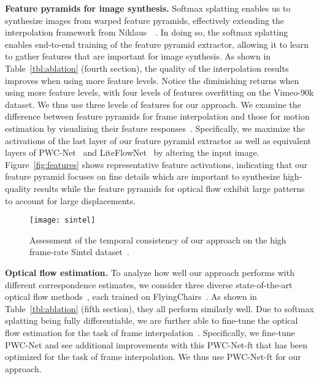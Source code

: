 \documentclass[10pt,twocolumn,letterpaper]{article}
\begin{document}
\vspace{0.05in}
\noindent\textbf{Feature pyramids for image synthesis.} Softmax splatting enables us to synthesize images from warped feature pyramids, effectively extending the interpolation framework from Niklaus~\etal~\cite{Niklaus_CVPR_2018}. In doing so, the softmax splatting enables end-to-end training of the feature pyramid extractor, allowing it to learn to gather features that are important for image synthesis. As shown in Table~\ref{tbl:ablation} (fourth section), the quality of the interpolation results improves when using more feature levels. Notice the diminishing returns when using more feature levels, with four levels of features overfitting on the Vimeo-90k dataset. We thus use three levels of features for our approach. We examine the difference between feature pyramids for frame interpolation and those for motion estimation by visualizing their feature responses~\cite{Erhan_OTHER_2009}. Specifically, we maximize the activations of the last layer of our feature pyramid extractor as well as equivalent layers of PWC-Net~\cite{Sun_CVPR_2018} and LiteFlowNet~\cite{Hui_CVPR_2018} by altering the input image. Figure~\ref{fig:features} shows representative feature activations, indicating that our feature pyramid focuses on fine details which are important to synthesize high-quality results while the feature pyramids for optical flow exhibit large patterns to account for large displacements.

\begin{figure}\centering
    \hspace{-0.1cm}\texttt{[image: sintel]}\vspace{-0.2cm}
	\caption{Assessment of the temporal consistency of our approach on the high frame-rate Sintel dataset~\cite{Janai_CVPR_2017}.}\vspace{-0.3cm}
	\label{fig:sintel}
\end{figure}

\vspace{0.05in}
\noindent\textbf{Optical flow estimation.} To analyze how well our approach performs with different correspondence estimates, we consider three diverse state-of-the-art optical flow methods~\cite{Hui_CVPR_2018, Ilg_CVPR_2017, Sun_CVPR_2018}, each trained on FlyingChairs~\cite{Dosovitskiy_ICCV_2015}. As shown in Table~\ref{tbl:ablation} (fifth section), they all perform similarly well. Due to softmax splatting being fully differentiable, we are further able to fine-tune the optical flow estimation for the task of frame interpolation~\cite{Xue_IJCV_2019}. Specifically, we fine-tune PWC-Net and see additional improvements with this PWC-Net-ft that has been optimized for the task of frame interpolation. We thus use PWC-Net-ft for our approach.
\end{document}
